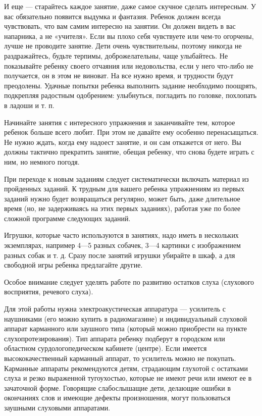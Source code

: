 \documentclass[a5paper]{book}
\begin{document}
И еще --- старайтесь каждое занятие, даже самое скучное сделать
интересным. У вас обязательно появится выдумка и фантазия. Ребенок
должен всегда чувствовать, что вам самим интересно на занятии. Он должен
видеть в вас напарника, а не «учителя». Если вы плохо себя чувствуете
или чем-то огорчены, лучше не проводите занятие. Дети очень
чувствительны, поэтому никогда не раздражайтесь, будьте терпимы,
доброжелательны, чаще улыбайтесь. Не показывайте ребенку своего отчаяния
или недовольства, если у него что-либо не получается, он в этом не
виноват. На все нужно время, и трудности будут преодолены. Удачные
попытки ребенка выполнить задание необходимо поощрять, подкрепляя
радостным одобрением: улыбнуться, погладить по головке, похлопать в
ладоши и т. п.

Начинайте занятия с интересного упражнения и заканчивайте тем, которое
ребенок больше всего любит. При этом не давайте ему особенно
перенасыщаться. Не нужно ждать, когда ему надоест занятие, и он сам
откажется от него. Вы должны тактично прекратить занятие, обещая
ребенку, что снова будете играть с ним, но немного погодя.

При переходе к новым заданиям следует систематически включать материал
из пройденных заданий. К трудным для вашего ребенка упражнениям из
первых заданий нужно будет возвращаться регулярно, может быть, даже
длительное время (но, не задерживаясь на этих первых заданиях), работая
уже по более сложной программе следующих заданий.

Игрушки, которые часто используются в занятиях, надо иметь в нескольких
экземплярах, например 4---5 разных собачек, 3---4 картинки с
изображением разных собак и т. д. Сразу после занятий игрушки убирайте в
шкаф, а для свободной игры ребенка предлагайте другие.

Особое внимание следует уделять работе по развитию остатков слуха
(слухового восприятия, речевого слуха).

Для этой работы нужна электроакустическая аппаратура --- усилитель с
наушниками (его можно купить в радиомагазине) и индивидуальный слуховой
аппарат карманного или заушного типа (который можно приобрести на пункте
слухопротезирования). Тип аппарата ребенку подберут в городском или
областном сурдологопедическом кабинете (центре). Если имеется
высококачественный карманный аппарат, то усилитель можно не покупать.
Карманные аппараты рекомендуются детям, страдающим глухотой с остатками
слуха и резко выраженной тугоухостью, которые не имеют речи или имеют ее
в зачаточной форме. Говорящие слабослышащие дети, делающие ошибки в
окончаниях слов и имеющие дефекты произношения, могут пользоваться
заушными слуховыми аппаратами.
\end{document}
